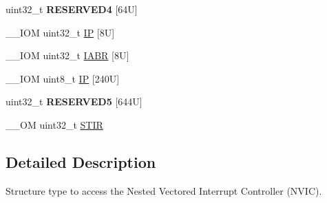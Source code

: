 \begin{DoxyCompactItemize}
\item 
\hypertarget{struct_n_v_i_c___type_af88b33dd5c8644293a71905a6d22f2f2}{uint32\-\_\-t {\bfseries R\-E\-S\-E\-R\-V\-E\-D4} \mbox{[}64\-U\mbox{]}}\label{struct_n_v_i_c___type_af88b33dd5c8644293a71905a6d22f2f2}

\item 
\-\_\-\-\_\-\-I\-O\-M uint32\-\_\-t \hyperlink{struct_n_v_i_c___type_a4eef47929a0d1317a107f1ac62e28464}{I\-P} \mbox{[}8\-U\mbox{]}
\item 
\-\_\-\-\_\-\-I\-O\-M uint32\-\_\-t \hyperlink{struct_n_v_i_c___type_ac803b714c8dd99a308ce9a0a2c611c56}{I\-A\-B\-R} \mbox{[}8\-U\mbox{]}
\item 
\-\_\-\-\_\-\-I\-O\-M uint8\-\_\-t \hyperlink{struct_n_v_i_c___type_a9a4341692e45d089a113986a3d344e98}{I\-P} \mbox{[}240\-U\mbox{]}
\item 
\hypertarget{struct_n_v_i_c___type_a22dc0f9f456717bd26de5a6451547be3}{uint32\-\_\-t {\bfseries R\-E\-S\-E\-R\-V\-E\-D5} \mbox{[}644\-U\mbox{]}}\label{struct_n_v_i_c___type_a22dc0f9f456717bd26de5a6451547be3}

\item 
\-\_\-\-\_\-\-O\-M uint32\-\_\-t \hyperlink{struct_n_v_i_c___type_a37de89637466e007171c6b135299bc75}{S\-T\-I\-R}
\end{DoxyCompactItemize}


\subsection{Detailed Description}
Structure type to access the Nested Vectored Interrupt Controller (N\-V\-I\-C). 

